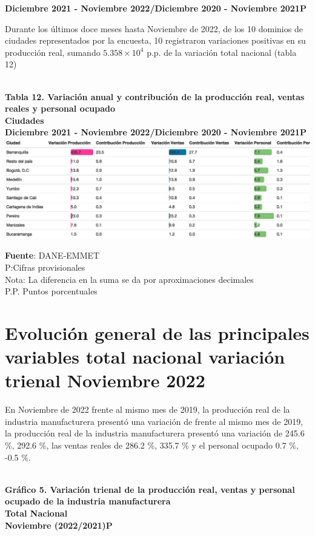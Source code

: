 \documentclass[
]{article}
\begin{document}
\textbf{Diciembre 2021 - Noviembre 2022/Diciembre 2020 - Noviembre
2021P}\\

\hfill\break

Durante los últimos doce meses hasta Noviembre de 2022, de los 10
dominios de ciudades representados por la encuesta, 10 registraron
variaciones positivas en su producción real, sumando
\ensuremath{5.358\times 10^{4}} p.p. de la variación total nacional
(tabla 12)\\
\strut \\
\textbf{Tabla 12. Variación anual y contribución de la producción real,
ventas reales y personal ocupado}\\
\textbf{Ciudades}\\
\textbf{Diciembre 2021 - Noviembre 2022/Diciembre 2020 - Noviembre
2021P}\\

\includegraphics{boletin_files/figure-latex/tabla12_view-1.png}

\textbf{Fuente}: DANE-EMMET\\
P:Cifras provisionales\\
Nota: La diferencia en la suma se da por aproximaciones decimales\\
P.P. Puntos porcentuales\\

\hypertarget{evoluciuxf3n-general-de-las-principales-variables-total-nacional-variaciuxf3n-trienal-noviembre-2022}{%
\section{Evolución general de las principales variables total nacional
variación trienal Noviembre
2022}\label{evoluciuxf3n-general-de-las-principales-variables-total-nacional-variaciuxf3n-trienal-noviembre-2022}}

En Noviembre de 2022 frente al mismo mes de 2019, la producción real de
la industria manufacturera presentó una variación de frente al mismo mes
de 2019, la producción real de la industria manufacturera presentó una
variación de 245.6 \%, 292.6 \%, las ventas reales de 286.2 \%, 335.7 \%
y el personal ocupado 0.7 \%, -0.5 \%.\\
\strut \\
\textbf{Gráfico 5. Variación trienal de la producción real, ventas y
personal ocupado de la industria manufacturera}\\
\textbf{Total Nacional}\\
\textbf{Noviembre (2022/2021)P}\\
\end{document}
